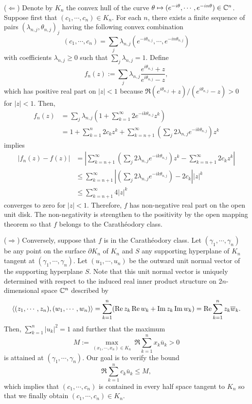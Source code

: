 \documentclass[12pt]{article}
\begin{document}
\begin{pf}
($\Leftarrow$)
Denote by $K_n$ the convex hull of the curve $\theta\mapsto(e^{-i\theta},\cdots,e^{-in\theta})\in\mathbb{C}^n$.
Suppose first that $(c_1,\cdots,c_n)\in K_n$.
For each $n$, there exists a finite sequence of pairs $(\lambda_{n,j},\theta_{n,j})_j$ having the following convex combination
\[(c_1,\cdots,c_n)=\sum_j\lambda_{n,j}(e^{-i\theta_{n,j}},\cdots,e^{-in\theta_{n,j}})\]
with coefficients $\lambda_{n,j}\ge0$ such that $\sum_j\lambda_{n,j}=1$.
Define
\[f_n(z):=\sum_j\lambda_{n,j}\frac{e^{i\theta_{n,j}}+z}{e^{i\theta_{n,j}}-z},\]
which has positive real part on $|z|<1$ because $\Re(e^{i\theta_{n,j}}+z)/(e^{i\theta_{n,j}}-z)>0$ for $|z|<1$.
Then,
\begin{align*}
f_n(z)
&=\sum_j\lambda_{n,j}(1+\sum_{k=1}^\infty2e^{-ik\theta_{n,j}}z^k)\\
&=1+\sum_{k=1}^n2c_kz^k+\sum_{k=n+1}^\infty\left(\sum_j2\lambda_{n,j}e^{-ik\theta_{n,j}}\right)z^k
\end{align*}
implies
\begin{align*}
|f_n(z)-f(z)|
&=\left|\sum_{k=n+1}^\infty\left(\sum_j2\lambda_{n,j}e^{-ik\theta_{n,j}}\right)z^k-\sum_{k=n+1}^\infty2c_kz^k\right|\\
&\le\sum_{k=n+1}^\infty\left|\left(\sum_j2\lambda_{n,j}e^{-ik\theta_{n,j}}\right)-2c_k\right||z|^k\\
&\le\sum_{k=n+1}^\infty4|z|^k
\end{align*}
converges to zero for $|z|<1$.
Therefore, $f$ has non-negative real part on the open unit disk.
The non-negativity is strengthen to the positivity by the open mapping theorem so that $f$ belongs to the Carath\'eodory class.

($\Rightarrow$)
Conversely, suppose that $f$ is in the Carath\'eodory class.
Let $(\gamma_1,\cdots,\gamma_n)$ be any point on the surface $\partial K_n$ of $K_n$ and $S$ any supporting hyperplane of $K_n$ tangent at $(\gamma_1,\cdots,\gamma_n)$.
Let $(u_1,\cdots,u_n)$ be the outward unit normal vector of the supporting hyperplane $S$.
Note that this unit normal vector is uniquely determined with respect to the induced real inner product structure on $2n$-dimensional space $\mathbb{C}^n$ described by
\[\langle(z_1,\cdots,z_n),(w_1,\cdots,w_n)\rangle=\sum_{k=1}^n(\operatorname{Re} z_k\operatorname{Re} w_k+\operatorname{Im} z_k\operatorname{Im} w_k)=\operatorname{Re}\sum_{k=1}^nz_k\overline w_k.\]
Then, $\sum_{k=1}^n|u_k|^2=1$ and further that the maximum
\[M:=\max_{(x_1,\cdots,x_n)\in K_n}\ \Re\sum_{k=1}^nx_k\bar u_k>0\]
is attained at $(\gamma_1,\cdots,\gamma_n)$.
Our goal is to verify the bound
\[\Re\sum_{k=1}^nc_k\bar u_k\le M,\]
which implies that $(c_1,\cdots,c_n)$ is contained in every half space tangent to $K_n$ so that we finally obtain $(c_1,\cdots,c_n)\in K_n$.


\end{pf}
\end{document}
